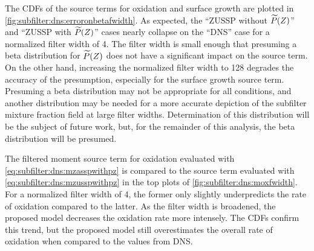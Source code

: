 The CDFs of the source terms for oxidation and surface growth are plotted in \cref{fig:subfilter:dns:erroronbetafwidth}. As expected, the ``ZUSSP without $\widetilde{P}(Z)$'' and ``ZUSSP with $\widetilde{P}(Z)$'' cases nearly collapse on the ``DNS'' case for a normalized filter width of 4. The filter width is small enough that presuming a beta distribution for $\widetilde{P}(Z)$ does not have a significant impact on the source term. On the other hand, increasing the normalized filter width to 128 degrades the accuracy of the presumption, especially for the surface growth source term. Presuming a beta distribution may not be appropriate for all conditions, and another distribution may be needed for a more accurate depiction of the subfilter mixture fraction field at large filter widths. Determination of this distribution will be the subject of future work, but, for the remainder of this analysis, the beta distribution will be presumed.

The filtered moment source term for oxidation evaluated with \cref{eq:subfilter:dns:mzasspwithpz} is compared to the source term evaluated with \cref{eq:subfilter:dns:mzusspwithpz} in the top plots of \cref{fig:subfilter:dns:moxfwidth}. For a normalized filter width of 4, the former only slightly underpredicts the rate of oxidation compared to the latter. As the filter width is broadened, the proposed model decreases the oxidation rate more intensely. The CDFs confirm this trend, but the proposed model still overestimates the overall rate of oxidation when compared to the values from DNS.

